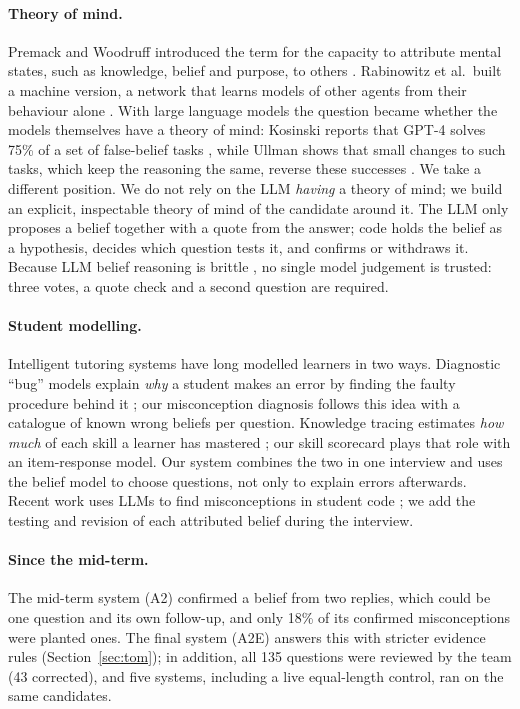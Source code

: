\documentclass[10pt,a4paper]{article}
\begin{document}
\paragraph{Theory of mind.} Premack and Woodruff introduced the term for the capacity to attribute
mental states, such as knowledge, belief and purpose, to others \cite{premack1978}. Rabinowitz et al.\
built a machine version, a network that learns models of other agents from their behaviour alone
\cite{rabinowitz2018}. With large language models the question became whether the models themselves
have a theory of mind: Kosinski reports that GPT-4 solves 75\% of a set of false-belief tasks
\cite{kosinski2024}, while Ullman shows that small changes to such tasks, which keep the reasoning the
same, reverse these successes \cite{ullman2023}. We take a different position. We do not rely on the
LLM \emph{having} a theory of mind; we build an explicit, inspectable theory of mind of the candidate
around it. The LLM only proposes a belief together with a quote from the answer; code holds the belief
as a hypothesis, decides which question tests it, and confirms or withdraws it. Because LLM belief
reasoning is brittle \cite{ullman2023}, no single model judgement is trusted: three votes, a quote
check and a second question are required.

\paragraph{Student modelling.} Intelligent tutoring systems have long modelled learners in two ways.
Diagnostic ``bug'' models explain \emph{why} a student makes an error by finding the faulty procedure
behind it \cite{brown1978}; our misconception diagnosis follows this idea with a catalogue of known
wrong beliefs per question. Knowledge tracing estimates \emph{how much} of each skill a learner has
mastered \cite{corbett1995}; our skill scorecard plays that role with an item-response model. Our
system combines the two in one interview and uses the belief model to choose questions, not only to
explain errors afterwards. Recent work uses LLMs to find misconceptions in student code
\cite{alhossami2025}; we add the testing and revision of each attributed belief during the interview.

\paragraph{Since the mid-term.} The mid-term system (A2) confirmed a belief from two replies, which
could be one question and its own follow-up, and only 18\% of its confirmed misconceptions were
planted ones. The final system (A2E) answers this with stricter evidence rules
(Section~\ref{sec:tom}); in addition, all 135 questions were reviewed by the team (43 corrected),
and five systems, including a live equal-length control, ran on the same candidates.
\end{document}
